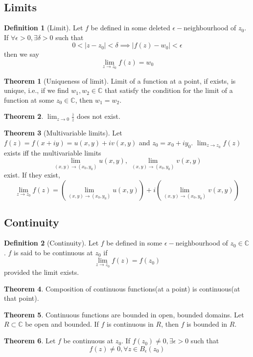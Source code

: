 \documentclass[10pt, a4paper]{extarticle}
\theoremstyle{definition}
\newtheorem{thm}{Theorem}
\newtheorem{defn}{Definition}
\begin{document}
\subsection{Limits}
\begin{defn}[Limit]
	Let $f$ be defined in some deleted $\epsilon-$neighbourhood of $z_0$. If $\forall \epsilon>0,\exists\delta>0$ such that
	\[0<|z-z_0|<\delta\implies|f(z)-w_0|<\epsilon\]
	then we say
	\[\lim_{z\to z_0}f(z)=w_0\]

\end{defn}
\begin{thm}[Uniqueness of limit]
	Limit of a function at a point, if exists, is unique, i.e., if we find $w_1,w_2\in\mathbb{C}$ that satisfy the condition for the limit of a function at some $z_0\in\mathbb{C}$, then $w_1=w_2$.
\end{thm}
\begin{thm}
	$\lim_{z\to 0}\frac{\bar{z}}{z}$ does not exist.
\end{thm}
\begin{thm}[Multivariable limits]
	Let $f(z)=f(x+iy)=u(x,y)+iv(x,y)$ and $z_0=x_0+iy_0$. $\lim_{z\to z_0}f(z)$ exists iff the multivariable limits
	\[\lim_{(x,y)\to(x_0,y_0)}u(x,y),\ \lim_{(x,y)\to(x_0,y_0)}v(x,y)\]
	exist. If they exist,
	\[\lim_{z\to z_0}f(z)=\left(\lim_{(x,y)\to(x_0,y_0)}u(x,y)\right)+i\left(\lim_{(x,y)\to(x_0,y_0)}v(x,y)\right)\]
\end{thm}

\subsection{Continuity}
\begin{defn}[Continuity]
	Let $f$ be defined in some $\epsilon-$neighbourhood of $z_0\in\mathbb{C}$. $f$ is said to be continuous at $z_0$ if
	\[\lim_{z\to z_0}f(z)=f(z_0)\]
	provided the limit exists.
\end{defn}
\begin{thm}
	Composition of continuous functions(at a point) is continuous(at that point).
\end{thm}
\begin{thm}\label{bound}
	Continuous functions are bounded in open, bounded domains.
	Let $R\subset\mathbb{C}$ be open and bounded. If $f$ is continuous in $R$, then $f$ is bounded in $R$.
\end{thm}
\begin{thm}
	Let $f$ be continuous at $z_0$. If $f(z_0)\neq0,\exists \epsilon>0$ such that
	\[f(z)\neq 0,\forall z\in B_\epsilon(z_0)\]
\end{thm}
\end{document}
